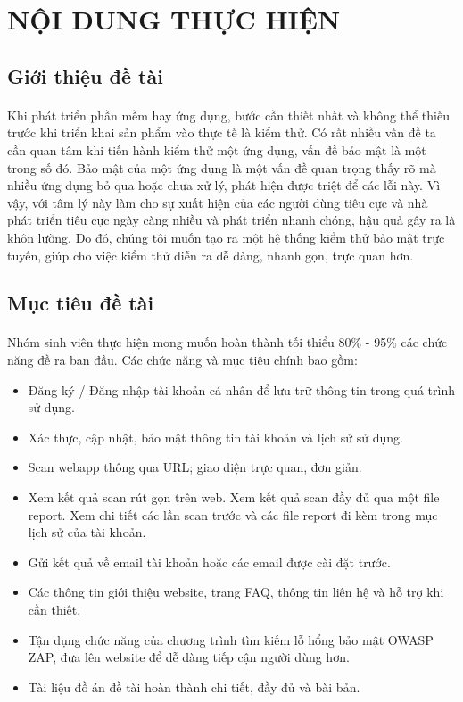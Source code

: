 
\section{NỘI DUNG THỰC HIỆN}

\subsection{Giới thiệu đề tài}
\paragraph{}
Khi phát triển phần mềm hay ứng dụng, bước cần thiết nhất và không thể thiếu
trước khi triển khai sản phẩm vào thực tế là kiểm thử. Có rất nhiều vấn đề ta cần
quan tâm khi tiến hành kiểm thử một ứng dụng, vấn đề bảo mật là một trong số đó. Bảo mật
của một ứng dụng là một vấn đề quan trọng thấy rõ mà nhiều ứng dụng bỏ qua hoặc chưa xử lý, phát hiện
được triệt để các lỗi này. Vì vậy, với tâm lý này làm cho sự xuất hiện của các người dùng tiêu cực và
nhà phát triển tiêu cực ngày càng nhiều và phát triển nhanh chóng, hậu quả gây ra là khôn lường.
Do đó, chúng tôi muốn tạo ra một hệ thống kiểm thử bảo mật trực tuyến, giúp cho việc kiểm thử diễn ra dễ dàng,
nhanh gọn, trực quan hơn.

\subsection{Mục tiêu đề tài}
\paragraph{}
Nhóm sinh viên thực hiện mong muốn hoàn thành tối thiểu 80\% - 95\% các chức năng đề ra ban đầu. Các chức năng và mục tiêu chính bao gồm:
\begin{itemize}
    \item Đăng ký / Đăng nhập tài khoản cá nhân để lưu trữ thông tin trong quá trình sử dụng.
    \item Xác thực, cập nhật, bảo mật thông tin tài khoản và lịch sử sử dụng.
    \item Scan webapp thông qua URL; giao diện trực quan, đơn giản.
    \item Xem kết quả scan rút gọn trên web. Xem kết quả scan đầy đủ qua một file report. Xem chi tiết các lần scan trước và các file report đi kèm trong mục lịch sử của tài khoản.
    \item Gửi kết quả về email tài khoản hoặc các email được cài đặt trước.
    \item Các thông tin giới thiệu website, trang FAQ, thông tin liên hệ và hỗ trợ khi cần thiết.
    \item Tận dụng chức năng của chương trình tìm kiếm lỗ hổng bảo mật OWASP ZAP, đưa lên website để dễ dàng tiếp cận người dùng hơn.
    \item Tài liệu đồ án đề tài hoàn thành chi tiết, đầy đủ và bài bản.
\end{itemize} 

